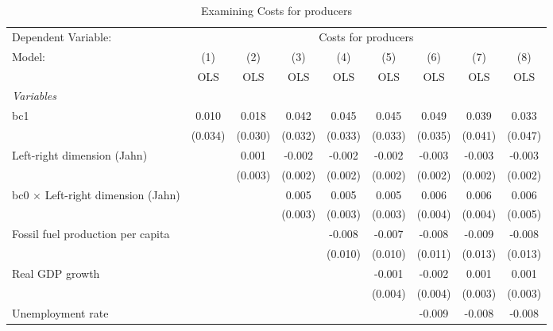
\begin{table}[htbp]
   \caption{Examining Costs for producers}
   \centering
   \begin{tabular}{lcccccccc}
      \toprule
      Dependent Variable: & \multicolumn{8}{c}{Costs for producers}\\
      Model:                                    & (1)     & (2)     & (3)     & (4)     & (5)     & (6)     & (7)     & (8)\\  
                                                &  OLS    & OLS     & OLS     & OLS     & OLS     & OLS     & OLS     & OLS\\  
      \midrule
      \emph{Variables}\\
      bc1                                       & 0.010   & 0.018   & 0.042   & 0.045   & 0.045   & 0.049   & 0.039   & 0.033\\   
                                                & (0.034) & (0.030) & (0.032) & (0.033) & (0.033) & (0.035) & (0.041) & (0.047)\\   
      Left-right dimension (Jahn)               &         & 0.001   & -0.002  & -0.002  & -0.002  & -0.003  & -0.003  & -0.003\\   
                                                &         & (0.003) & (0.002) & (0.002) & (0.002) & (0.002) & (0.002) & (0.002)\\   
      bc0 $\times$ Left-right dimension (Jahn)  &         &         & 0.005   & 0.005   & 0.005   & 0.006   & 0.006   & 0.006\\   
                                                &         &         & (0.003) & (0.003) & (0.003) & (0.004) & (0.004) & (0.005)\\   
      Fossil fuel production per capita         &         &         &         & -0.008  & -0.007  & -0.008  & -0.009  & -0.008\\   
                                                &         &         &         & (0.010) & (0.010) & (0.011) & (0.013) & (0.013)\\   
      Real GDP growth                           &         &         &         &         & -0.001  & -0.002  & 0.001   & 0.001\\   
                                                &         &         &         &         & (0.004) & (0.004) & (0.003) & (0.003)\\   
      Unemployment rate                         &         &         &         &         &         & -0.009  & -0.008  & -0.008\\   

\end{tabular}
\end{table}
